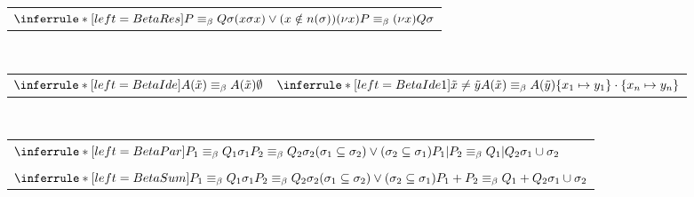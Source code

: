 \begin{definition}
\begin{table}
\begin{tabular}{l}
	  $\inferrule*[left=BetaRes]{
	      P\equiv_{\beta}Q
	    \\
	      \sigma
	    \\
	      (x \sigma x) \vee (x\notin n(\sigma))
	  }{
	      (\nu x)P\equiv_{\beta}(\nu x)Q
	    \\
	      \sigma
	  }$
      \\
    \end{tabular}
    \\
    \begin{tabular}{ll}
      \\
	  $\inferrule*[left=BetaIde]{
	  }{
	      A(\tilde{x})\equiv_{\beta}A(\tilde{x})
	    \\
	      \emptyset
	  }$
	&
	  $\inferrule*[left=BetaIde1]{
	    \tilde{x} \neq \tilde{y}
	  }{
	      A(\tilde{x})\equiv_{\beta}A(\tilde{y})
	    \\
	      \{x_{1}\mapsto y_{1}\}\cdot\{x_{n}\mapsto y_{n}\}
	  }$
      \\
    \end{tabular}
    \\
    \begin{tabular}{l}
      \\
	  $\inferrule*[left=BetaPar]{
	      P_{1}\equiv_{\beta}Q_{1}
	    \\
	      \sigma_{1}
	    \\
	      P_{2}\equiv_{\beta}Q_{2}
	    \\
	      \sigma_{2}
	    \\
	      (\sigma_{1}\subseteq \sigma_{2}) \vee (\sigma_{2}\subseteq \sigma_{1})
	  }{
	      P_{1}|P_{2}\equiv_{\beta}Q_{1}|Q_{2}
	    \\
	      \sigma_{1} \cup \sigma_{2}
	  }$
      \\\\
	  $\inferrule*[left=BetaSum]{
	      P_{1}\equiv_{\beta} Q_{1}
	    \\
	      \sigma_{1}
	    \\
	      P_{2}\equiv_{\beta} Q_{2}
	    \\
	      \sigma_{2}
	    \\
	      (\sigma_{1}\subseteq \sigma_{2}) \vee (\sigma_{2}\subseteq \sigma_{1})
	  }{
	      P_{1}+P_{2}\equiv_{\beta}Q_{1}+Q_{2}
	    \\
	      \sigma_{1} \cup \sigma_{2}
	  }$
      \\
    \end{tabular}
    \\
    \begin{tabular}{l}

\end{tabular}
\end{table}
\end{definition}
